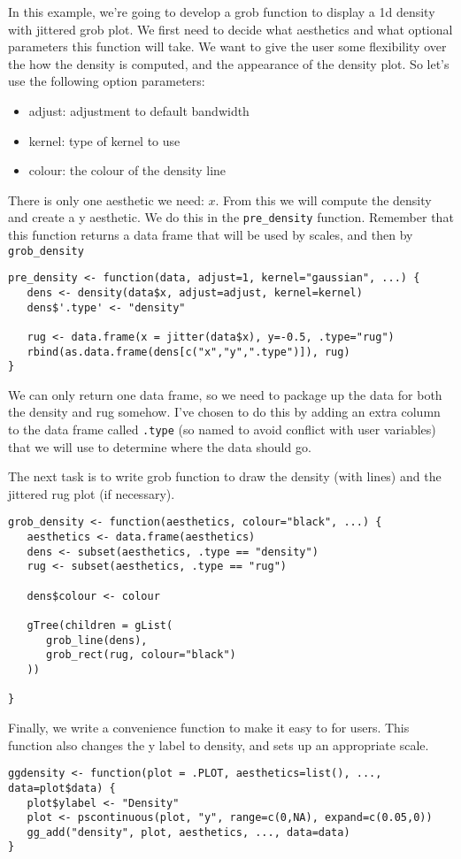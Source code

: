 In this example, we're going to develop a grob function to display a 1d density with jittered grob plot.  We first need to decide what aesthetics and what optional parameters this function will take.  We want to give the user some flexibility over the how the density is computed, and the appearance of the density plot.  So let's use the following option parameters:

\begin{itemize}
	\item adjust: adjustment to default bandwidth
	\item kernel: type of kernel to use
	\item colour: the colour of the density line
\end{itemize}

There is only one aesthetic we need: $x$.  From this we will compute the density and create a y aesthetic.  We do this in the \texttt{pre\_density} function.  Remember that this function returns a data frame that will be used by scales, and then by \texttt{grob\_density}

\begin{verbatim}
pre_density <- function(data, adjust=1, kernel="gaussian", ...) {
   dens <- density(data$x, adjust=adjust, kernel=kernel)
   dens$'.type' <- "density"

   rug <- data.frame(x = jitter(data$x), y=-0.5, .type="rug")
   rbind(as.data.frame(dens[c("x","y",".type")]), rug)
}
\end{verbatim}

We can only return one data frame, so we need to package up the data for both the density and rug somehow.  I've chosen to do this by adding an extra column to the data frame called \texttt{.type} (so named to avoid conflict with user variables) that we will use to determine where the data should go.

The next task is to write grob function to draw the density (with lines) and the jittered rug plot (if necessary).

\begin{verbatim}
grob_density <- function(aesthetics, colour="black", ...) {
   aesthetics <- data.frame(aesthetics)
   dens <- subset(aesthetics, .type == "density")
   rug <- subset(aesthetics, .type == "rug")

   dens$colour <- colour

   gTree(children = gList(
      grob_line(dens),
      grob_rect(rug, colour="black")
   ))

}
\end{verbatim}

Finally, we write a convenience function to make it easy to for users.  This function also changes the y label to density, and sets up an appropriate scale.

\begin{verbatim}
ggdensity <- function(plot = .PLOT, aesthetics=list(), ..., data=plot$data) {
   plot$ylabel <- "Density"
   plot <- pscontinuous(plot, "y", range=c(0,NA), expand=c(0.05,0))
   gg_add("density", plot, aesthetics, ..., data=data)
}  
\end{verbatim}



